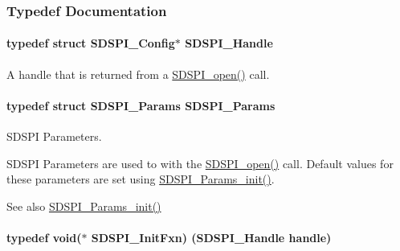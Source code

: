 \subsubsection{Typedef Documentation}
\paragraph[{S\+D\+S\+P\+I\+\_\+\+Handle}]{\setlength{\rightskip}{0pt plus 5cm}typedef struct {\bf S\+D\+S\+P\+I\+\_\+\+Config}$\ast$ {\bf S\+D\+S\+P\+I\+\_\+\+Handle}}\label{_s_d_s_p_i_8h_abd3d22133d60c2e5afd49722d6bafb7e}


A handle that is returned from a \hyperlink{_s_d_s_p_i_8h_af4a5ca9bb35e8a7df02acf20ceeae66d}{S\+D\+S\+P\+I\+\_\+open()} call. 

\paragraph[{S\+D\+S\+P\+I\+\_\+\+Params}]{\setlength{\rightskip}{0pt plus 5cm}typedef struct {\bf S\+D\+S\+P\+I\+\_\+\+Params}  {\bf S\+D\+S\+P\+I\+\_\+\+Params}}\label{_s_d_s_p_i_8h_a3fd9e0fa28415b0c0cf6ab03c37ca4d1}


S\+D\+S\+P\+I Parameters. 

S\+D\+S\+P\+I Parameters are used to with the \hyperlink{_s_d_s_p_i_8h_af4a5ca9bb35e8a7df02acf20ceeae66d}{S\+D\+S\+P\+I\+\_\+open()} call. Default values for these parameters are set using \hyperlink{_s_d_s_p_i_8h_a6fe24eaba1cca88242c5df360a074ca8}{S\+D\+S\+P\+I\+\_\+\+Params\+\_\+init()}.

\begin{DoxySeeAlso}{See also}
\hyperlink{_s_d_s_p_i_8h_a6fe24eaba1cca88242c5df360a074ca8}{S\+D\+S\+P\+I\+\_\+\+Params\+\_\+init()} 
\end{DoxySeeAlso}
\paragraph[{S\+D\+S\+P\+I\+\_\+\+Init\+Fxn}]{\setlength{\rightskip}{0pt plus 5cm}typedef void($\ast$ S\+D\+S\+P\+I\+\_\+\+Init\+Fxn) ({\bf S\+D\+S\+P\+I\+\_\+\+Handle} handle)}\label{_s_d_s_p_i_8h_af13f4dd690895ef9905b94eb35186f39}



